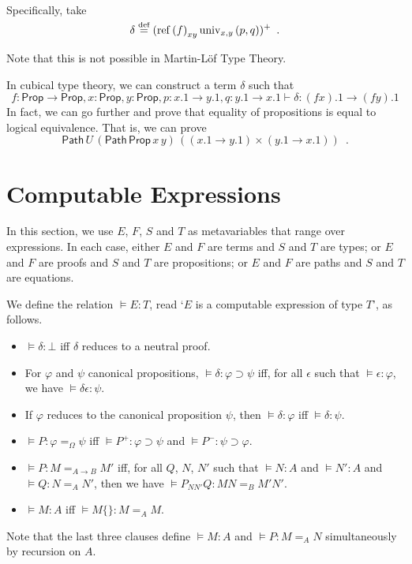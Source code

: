 \documentclass[a4paper,UKenglish]{lipics-v2016}
\newcommand*{\eqdef}{\mathrel{\smash{\stackrel{\text{def}}{=}}}}
\newcommand*{\reff}[1]{\ensuremath{\mathrm{ref} \left( {#1} \right)}}
\newcommand*{\univ}[4]{\ensuremath{\mathrm{univ}_{{#1}, {#2}} \left({#3} , {#4} \right)}}
\newcommand{\Path}[3]{\ensuremath{\mathsf{Path} \, {#1} \, {#2} \, {#3}}}
\newcommand{\Prop}{\mathsf{Prop}}
\theoremstyle{plain}
\theoremstyle{definition}
\begin{document}
Specifically, take
$$ \delta \eqdef (\reff{f}_{xy} \univ{x}{y}{p}{q})^+ \enspace . $$

Note that this is not possible in Martin-L\"{o}f Type Theory.

In cubical type theory, we can construct a term $\delta$ such that
$$ f : \Prop \rightarrow \Prop, x : \Prop, y : \Prop, p : x.1 \rightarrow y.1, q : y.1 \rightarrow x.1 \vdash \delta : (f x).1 \rightarrow (f y).1 $$
In fact, we can go further and prove that equality of propositions is equal to logical equivalence.  That is, we can prove
$$ \Path{U}{(\Path{\Prop}{x}{y})}{((x.1 \rightarrow y.1) \times (y.1 \rightarrow x.1))} \enspace . $$

\section{Computable Expressions}
\label{section:computable}

In this section, we use $E$, $F$, $S$ and $T$ as metavariables that range over expressions.  In each case, either $E$ and $F$ are terms and $S$ and $T$ are types; or $E$ and $F$ are
proofs and $S$ and $T$ are propositions; or $E$ and $F$ are paths and $S$ and $T$ are equations.

\begin{definition}
We define the relation $\models E : T$, read `$E$ is a computable expression of type $T$', as follows.
\begin{itemize}
\item
$\models \delta : \bot$ iff $\delta$ reduces to a neutral proof.
\item
For $\varphi$ and $\psi$ canonical propositions, $\models \delta : \varphi \supset \psi$ iff, for all $\epsilon$ such that $\models \epsilon : \varphi$, we have $\models \delta \epsilon : \psi$.
\item
If $\varphi$ reduces to the canonical proposition $\psi$, then $\models \delta : \varphi$ iff $\models \delta : \psi$.
\item
$\models P : \varphi =_\Omega \psi$ iff $\models P^+ : \varphi \supset \psi$ and $\models P^- : \psi \supset \varphi$.
\item
$\models P : M =_{A \rightarrow B} M'$ iff, for all $Q$, $N$, $N'$ such that $\models N : A$ and $\models N' : A$ and $\models Q : N =_A N'$, then we have $\models P_{NN'}Q : MN =_B M'N'$.
\item
$\models M : A$ iff $\models M \{\} : M =_A M$.
\end{itemize}
Note that the last three clauses define $\models M : A$ and $\models P : M =_A N$ simultaneously by recursion on $A$.
\end{definition}
\end{document}
